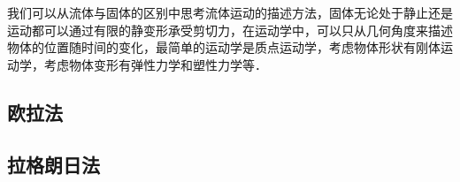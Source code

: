 
我们可以从流体与固体的区别中思考流体运动的描述方法，固体无论处于静止还是运动都可以通过有限的静变形承受剪切力，在运动学中，可以只从几何角度来描述物体的位置随时间的变化，最简单的运动学是质点运动学，考虑物体形状有刚体运动学，考虑物体变形有弹性力学和塑性力学等．


\subsection{欧拉法}

\subsection{拉格朗日法}